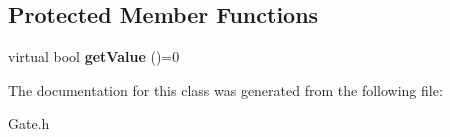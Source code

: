 \subsection*{Protected Member Functions}
\begin{DoxyCompactItemize}
\item 
virtual bool {\bfseries get\+Value} ()=0\hypertarget{classGate_a41c2d1a0e950f4c75d8c68f38d2b4afb}{}\label{classGate_a41c2d1a0e950f4c75d8c68f38d2b4afb}

\end{DoxyCompactItemize}


The documentation for this class was generated from the following file\+:\begin{DoxyCompactItemize}
\item 
Gate.\+h\end{DoxyCompactItemize}
